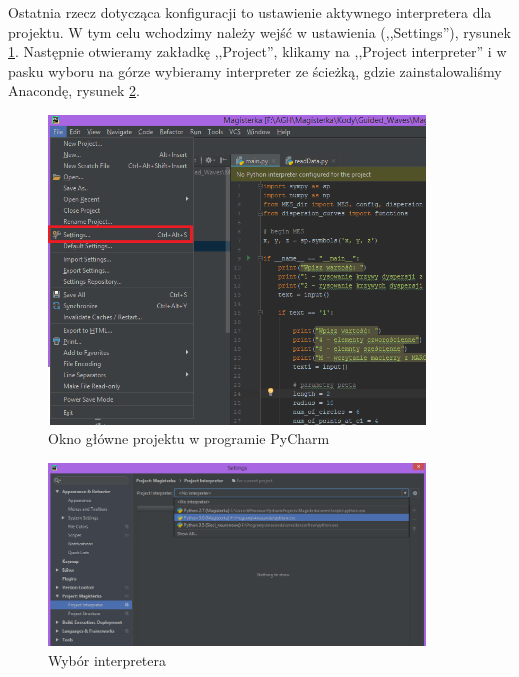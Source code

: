 Ostatnia rzecz dotycząca konfiguracji to ustawienie aktywnego interpretera dla projektu. W tym celu wchodzimy należy wejść w ustawienia (,,Settings''), rysunek \ref{fig:pycharm1}. Następnie otwieramy zakładkę ,,Project'', klikamy na ,,Project interpreter'' i w pasku wyboru na górze wybieramy interpreter ze ścieżką, gdzie zainstalowaliśmy Anacondę, rysunek \ref{fig:pycharm2}.

\begin{figure}[h]
\centering
\includegraphics[width=10cm]{Zdjecia/5/pycharm1}
\caption{Okno główne projektu w programie PyCharm}
\label{fig:pycharm1}
\end{figure}

\begin{figure}[h]
\centering
\includegraphics[width=10cm]{Zdjecia/5/pycharm2}
\caption{Wybór interpretera}
\label{fig:pycharm2}
\end{figure}










